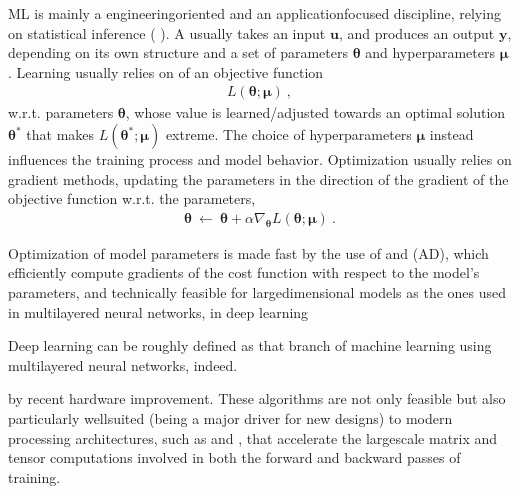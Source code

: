 \documentclass[letterpaper,10pt,english]{jupyterBook}
\begin{document}
\sphinxAtStartPar
{} ML is mainly a engineering\sphinxhyphen{}oriented and an application\sphinxhyphen{}focused discipline, relying on statistical inference ( ). A {\hyperref[\detokenize{ch/ml/models:ml-models}]{}} usually takes an input \(\mathbf{u}\), and produces an output \(\mathbf{y}\), depending on its own structure and a set of parameters \(\boldsymbol{\theta}\) and hyper\sphinxhyphen{}parameters \(\boldsymbol{\mu}\). Learning usually relies on  of an objective function
\begin{equation*}
\begin{split}L(\boldsymbol{\theta}; \boldsymbol{\mu}) \ ,\end{split}
\end{equation*}
\sphinxAtStartPar
w.r.t. parameters \(\boldsymbol{\theta}\), whose value is learned/adjusted towards an optimal solution \(\boldsymbol{\theta}^*\) that makes \(L(\boldsymbol{\theta}^*; \boldsymbol{\mu})\) extreme. The choice of hyper\sphinxhyphen{}parameters \(\boldsymbol{\mu}\) instead influences the training process and model behavior. Optimization usually relies on gradient methods, updating the parameters in the direction of the gradient of the objective function w.r.t. the parameters,
\begin{equation*}
\begin{split}\boldsymbol{\theta} \ \leftarrow \ \boldsymbol{\theta} + \alpha \nabla_{\boldsymbol{\theta}} L(\boldsymbol{\theta}; \boldsymbol{\mu}) \ .\end{split}
\end{equation*}


\sphinxAtStartPar
Optimization of model parameters is made fast by the use of  and  (AD), which efficiently compute gradients of the cost function with respect to the model’s parameters, and technically feasible for large\sphinxhyphen{}dimensional models \sphinxhyphen{} as the ones used in multi\sphinxhyphen{}layered neural networks, in deep learning%
\begin{footnote}[2]\sphinxAtStartFootnote
Deep learning can be roughly defined as that branch of machine learning using multi\sphinxhyphen{}layered neural networks, indeed.
%
\end{footnote} \sphinxhyphen{} by recent hardware improvement. These algorithms are not only feasible but also particularly well\sphinxhyphen{}suited (being a major driver for new designs) to modern processing architectures, such as  and , that accelerate the large\sphinxhyphen{}scale matrix and tensor computations involved in both the forward and backward passes of training.
\end{document}

